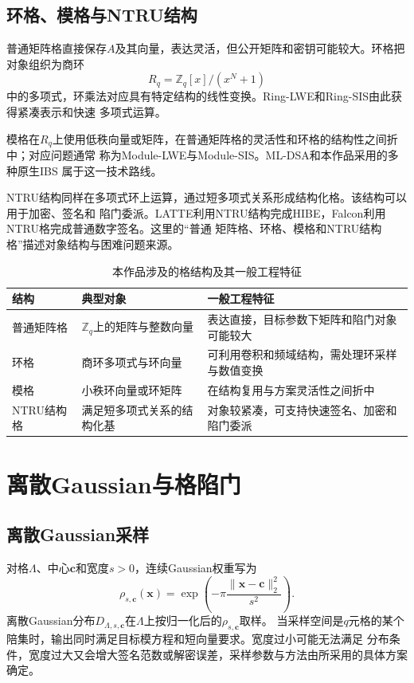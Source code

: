 \subsection{环格、模格与NTRU结构}

普通矩阵格直接保存$A$及其向量，表达灵活，但公开矩阵和密钥可能较大。环格把对象组织为商环
\[
 R_q=\mathbb Z_q[x]/(x^N+1)
\]
中的多项式，环乘法对应具有特定结构的线性变换。Ring-LWE和Ring-SIS由此获得紧凑表示和快速
多项式运算\cite{lpr2013ring}。

模格在$R_q$上使用低秩向量或矩阵，在普通矩阵格的灵活性和环格的结构性之间折中；对应问题通常
称为Module-LWE与Module-SIS\cite{langlois2015module}。ML-DSA和本作品采用的多种原生IBS
属于这一技术路线。

NTRU结构同样在多项式环上运算，通过短多项式关系形成结构化格。该结构可以用于加密、签名和
陷门委派。LATTE利用NTRU结构完成HIBE，Falcon利用NTRU格完成普通数字签名。这里的“普通
矩阵格、环格、模格和NTRU结构格”描述对象结构与困难问题来源。

\begin{table}[H]
\centering\small
\caption{本作品涉及的格结构及其一般工程特征}
\label{tab:lattice-families}
\begin{tabularx}{\textwidth}{@{}p{}p{}X@{}}
\toprule
\rowcolor{black!8} 结构 & 典型对象 & 一般工程特征 \\
\midrule
普通矩阵格 & $\mathbb Z_q$上的矩阵与整数向量 & 表达直接，目标参数下矩阵和陷门对象可能较大 \\
环格 & 商环多项式与环向量 & 可利用卷积和频域结构，需处理环采样与数值变换 \\
模格 & 小秩环向量或环矩阵 & 在结构复用与方案灵活性之间折中 \\
NTRU结构格 & 满足短多项式关系的结构化基 & 对象较紧凑，可支持快速签名、加密和陷门委派 \\
\bottomrule
\end{tabularx}
\end{table}

\section{离散Gaussian与格陷门}

\subsection{离散Gaussian采样}

对格$\Lambda$、中心$\mathbf c$和宽度$s>0$，连续Gaussian权重写为
\[
 \rho_{s,\mathbf c}(\mathbf x)=
 \exp\!\left(-\pi\frac{\lVert\mathbf x-\mathbf c\rVert_2^2}{s^2}\right).
\]
离散Gaussian分布$D_{\Lambda,s,\mathbf c}$在$\Lambda$上按归一化后的$\rho_{s,\mathbf c}$取样。
当采样空间是$q$元格的某个陪集时，输出同时满足目标模方程和短向量要求。宽度过小可能无法满足
分布条件，宽度过大又会增大签名范数或解密误差，采样参数与方法由所采用的具体方案确定。

